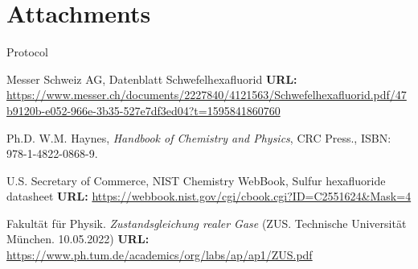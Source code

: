 \documentclass[10pt,a4paper]{article}
\begin{document}
\section{Attachments}
Protocol


\begin{thebibliography}{9}

  Messer Schweiz AG, Datenblatt Schwefelhexafluorid
  \textbf{URL:} \url{https://www.messer.ch/documents/2227840/4121563/Schwefelhexafluorid.pdf/47b9120b-e052-966e-3b35-527e7df3ed04?t=1595841860760}
  
  Ph.D. W.M. Haynes,
  \textit{Handbook of Chemistry and Physics},
  CRC Press.,
  ISBN: 978-1-4822-0868-9.
  
  U.S. Secretary of Commerce, NIST Chemistry WebBook, Sulfur hexafluoride datasheet
  \textbf{URL:} \url{https://webbook.nist.gov/cgi/cbook.cgi?ID=C2551624&Mask=4}  
  
  
  Fakultät für Physik. \emph{Zustandsgleichung realer Gase} (ZUS. Technische Universität München. 10.05.2022)
  \textbf{URL:} \url{https://www.ph.tum.de/academics/org/labs/ap/ap1/ZUS.pdf}
  
  
\newpage
  
\end{thebibliography}


\end{document}
